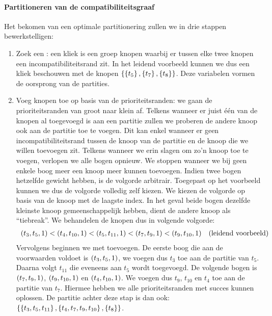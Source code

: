 \paragraph{Partitioneren van de compatibiliteitsgraaf}
Het bekomen van een optimale partitionering zullen we in drie stappen bewerkstelligen:
\begin{enumerate}
 \item Zoek een : een kliek is een groep knopen waarbij er tussen elke twee knopen een incompatibiliteitsrand zit. In het leidend voorbeeld kunnen we dus een kliek beschouwen met de knopen $\left\{\left\{t_5\right\},\left\{t_7\right\},\left\{t_8\right\}\right\}$. Deze variabelen vormen de oorsprong van de partities.
 \item \label{item:partitioningCompatibilityStepB} Voeg knopen toe op basis van de prioriteitsranden: we gaan de prioriteitsranden van groot naar klein af. Telkens wanneer er juist \'e\'en van de knopen al toegevoegd is aan een partitie zullen we proberen de andere knoop ook aan de partitie toe te voegen. Dit kan enkel wanneer er geen incompatibiliteitsrand tussen de knoop van de partitie en de knoop die we willen toevoegen zit. Telkens wanneer we erin slagen om zo'n knoop toe te voegen, verlopen we alle bogen opnieuw. We stoppen wanneer we bij geen enkele boog meer een knoop meer kunnen toevoegen. Indien twee bogen hetzelfde gewicht hebben, is de volgorde arbitrair. Toegepast op het voorbeeld kunnen we dus de volgorde volledig zelf kiezen. We kiezen de volgorde op basis van de knoop met de laagste index. In het geval beide bogen dezelfde kleinste knoop gemeenschappelijk hebben, dient de andere knoop als ``tiebreak''. We behandelen de knopen dus in volgende volgorde:
\begin{equation}
\begin{array}{ll}
\left( t_3,t_5,1 \right)<\left( t_4,t_{10},1 \right)<\left( t_5,t_{11},1 \right)<\left( t_7,t_9,1 \right)<\left( t_9,t_{10},1 \right)&\mbox{(leidend voorbeeld)}
\end{array}
\end{equation}
Vervolgens beginnen we met toevoegen. De eerste boog die aan de voorwaarden voldoet is $\left( t_3,t_5,1 \right)$, we voegen dus $t_3$ toe aan de partitie van $t_5$. Daarna volgt $t_{11}$ die eveneens aan $t_5$ wordt toegevoegd. De volgende bogen is $\left( t_7,t_9,1 \right)$, $\left( t_9,t_{10},1 \right)$ en $\left( t_4,t_{10},1 \right)$. We voegen dus $t_9$, $t_10$ en $t_4$ toe aan de partitie van $t_7$. Hiermee hebben we alle prioriteitsranden met succes kunnen oplossen. De partitie achter deze stap is dan ook: $\left\{\left\{t_3,t_5,t_{11}\right\},\left\{t_4,t_7,t_9,t_{10}\right\},\left\{t_8\right\}\right\}$.

\end{enumerate}
